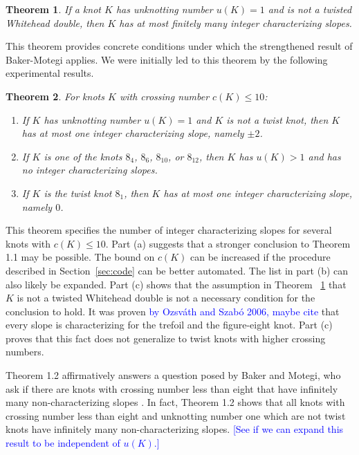 \documentclass[11pt,usenames,dvipsnames,reqno]{amsart}
\newtheorem{theorem}{Theorem}
\numberwithin{theorem}{section}
\theoremstyle{ex}
\theoremstyle{rem}
\def\kh#1{\textcolor{Blue}{#1}}
\begin{document}
\begin{theorem}\label{thm:unknotting-one} If a knot $K$ has unknotting number $u(K)=1$ and is not a twisted Whitehead double, then $K$ has at most finitely many integer characterizing slopes.
\end{theorem}

This theorem provides concrete conditions under which the strengthened result of Baker-Motegi applies. We were initially led to this theorem by the following experimental results.

\begin{theorem}\label{thm:low-crossing} For knots $K$ with crossing number $c(K) \leq 10$:
	\begin{enumerate}[label=\normalfont \bf (\alph*)]
		\item If $K$ has unknotting number $u(K)=1$ and $K$ is not a twist knot, then $K$ has at most one integer characterizing slope, namely $\pm 2$.
		\item If $K$ is one of the knots $8_4$, $8_6$, $8_{10}$, or $8_{12}$, then $K$ has $u(K)>1$ and has no integer characterizing slopes.
		\item If $K$ is the twist knot $8_1$, then $K$ has at most one integer characterizing slope, namely $0$.
	\end{enumerate}
\end{theorem}

This theorem specifies the number of integer characterizing slopes for several knots with $c(K) \leq 10$. Part (a) suggests that a stronger conclusion to Theorem 1.1 may be possible. The bound on $c(K)$ can be increased if the procedure described in Section~\ref{sec:code} can be better automated. The list in part (b) can also likely be expanded. Part (c) shows that the assumption in Theorem ~\ref{thm:unknotting-one} that $K$ is not a twisted Whitehead double is not a necessary condition for the conclusion to hold. It was proven \kh{by Ozsv\'{a}th and Szab\'{o} 2006, maybe cite}  that every slope is characterizing for the trefoil and the figure-eight knot. Part (c) proves that this fact does not generalize to twist knots with higher crossing numbers.

Theorem 1.2 affirmatively answers a question posed by Baker and Motegi, who ask if there are knots with crossing number less than eight that have infinitely many non-characterizing slopes \cite[Question~1.7]{baker-motegi}. In fact, Theorem 1.2 shows that all knots with crossing number less than eight and unknotting number one which are not twist knots have infinitely many non-characterizing slopes. \kh{[See if we can expand this result to be independent of $u(K)$.]}
\end{document}
